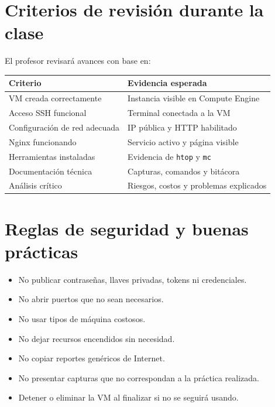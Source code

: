 \documentclass[
  coursetitle={Cómputo Nube y Tecnologías Emergentes},
  coursehours={96},
  coursedate={Verano 2026},
  doctype={Práctica},
  otherlangs={english,french},
  authorname={Lázaro},
  authorsurname={Bustio-Martínez},
  authortitle={PhD},
  role={Profesor Investigador},
  email={lbustio@inaoe.mx},
  phone={5559504000},
  ext={7459},
  institution={Instituto Nacional de Astrofísica, Óptica y Electrónica (INAOE)},
  department={Maestría en Ciencias en Tecnologías de Seguridad},
  address={Luis Enrique Erro 1, Sta. Ma. Tonantzintla, San Andrés Cholula, CP 72840, Puebla, México},
  margin={0.5in}
]{../../lbustio_lecture_notes}
\begin{document}
\section{Criterios de revisión durante la clase}

El profesor revisará avances con base en:

\begin{table}[h]
\centering
\renewcommand{\arraystretch}{1.15}
\begin{tabularx}{\textwidth}{|p{5.1cm}|Y|}
\hline
\textbf{Criterio} & \textbf{Evidencia esperada} \\
\hline
VM creada correctamente & Instancia visible en Compute Engine \\
\hline
Acceso SSH funcional & Terminal conectada a la VM \\
\hline
Configuración de red adecuada & IP pública y HTTP habilitado \\
\hline
Nginx funcionando & Servicio activo y página visible \\
\hline
Herramientas instaladas & Evidencia de \texttt{htop} y \texttt{mc} \\
\hline
Documentación técnica & Capturas, comandos y bitácora \\
\hline
Análisis crítico & Riesgos, costos y problemas explicados \\
\hline
\end{tabularx}
\end{table}

\section{Reglas de seguridad y buenas prácticas}

\begin{tcolorbox}[title=Seguridad mínima,colback=cloudred!5,colframe=cloudred]
\begin{itemize}
    \item No publicar contraseñas, llaves privadas, tokens ni credenciales.
    \item No abrir puertos que no sean necesarios.
    \item No usar tipos de máquina costosos.
    \item No dejar recursos encendidos sin necesidad.
    \item No copiar reportes genéricos de Internet.
    \item No presentar capturas que no correspondan a la práctica realizada.
    \item Detener o eliminar la VM al finalizar si no se seguirá usando.
\end{itemize}
\end{tcolorbox}
\end{document}
